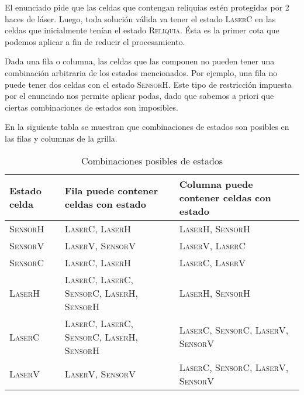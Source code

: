 \documentclass[11pt, a4paper, twoside]{article}
\begin{document}
El enunciado pide que las celdas que contengan reliquias estén protegidas por 2 haces de láser.
Luego, toda solución válida va tener el estado \textsc{LaserC} en las celdas que inicialmente
tenían el estado \textsc{Reliquia}.
Ésta es la primer cota que podemos aplicar a fin de reducir el procesamiento.

Dada una fila o columna, las celdas que las componen no pueden tener una
combinación arbitraria de los estados mencionados.
Por ejemplo, una fila no puede tener dos celdas con el estado \textsc{SensorH}.
Este tipo de restricción impuesta por el enunciado nos permite aplicar podas,
dado que sabemos a priori que ciertas combinaciones de estados son imposibles.

En la siguiente tabla se muestran que combinaciones de estados son posibles en las filas y columnas de la grilla.
\begin{table}
\begin{center}
	\begin{tabular}{ | l | p{5cm} |p{5cm} | }
		\hline
		\textbf{Estado celda} & \textbf{Fila puede contener celdas con estado} & \textbf{Columna puede contener celdas con estado} \\
		\hline
		\textsc{SensorH} & \textsc{LaserC}, \textsc{LaserH} & \textsc{LaserH}, \textsc{SensorH} \\		\hline
		\textsc{SensorV} & \textsc{LaserV}, \textsc{SensorV} & \textsc{LaserV}, \textsc{LaserC}\\ 		\hline
		\textsc{SensorC} & \textsc{LaserC}, \textsc{LaserH} & \textsc{LaserC}, \textsc{LaserV}\\ 		\hline
		\textsc{LaserH}  & \textsc{LaserC}, \textsc{LaserC}, \textsc{SensorC}, \textsc{LaserH}, \textsc{SensorH} &  \textsc{LaserH}, \textsc{SensorH} \\ 		\hline
		\textsc{LaserC}  & \textsc{LaserC}, \textsc{LaserC}, \textsc{SensorC}, \textsc{LaserH}, \textsc{SensorH} & \textsc{LaserC}, \textsc{SensorC}, \textsc{LaserV}, \textsc{SensorV} \\ 		\hline
		\textsc{LaserV}  & \textsc{LaserV}, \textsc{SensorV} & \textsc{LaserC}, \textsc{SensorC}, \textsc{LaserV}, \textsc{SensorV}  \\ \hline
	\end{tabular}
	
\end{center}
\caption{Combinaciones posibles de estados}
		\label{tab:Estados}
\end{table}
\end{document}
